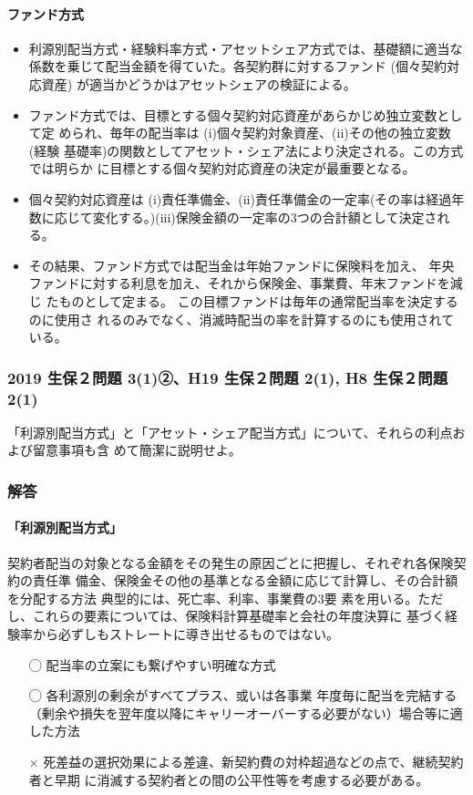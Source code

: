 \documentclass[report,gutter=10mm,fore-edge=10mm,uplatex,dvipdfmx]{jlreq}
\begin{document}
\paragraph{ファンド方式}

\begin{itemize}
 \item 利源別配当方式・経験料率方式・アセットシェア方式では、基礎額に適当な係数を乗じて配当金額を得ていた。各契約群に対するファンド (個々契約対応資産) が適当かどうかはアセットシェアの検証による。
 \item ファンド方式では、目標とする個々契約対応資産があらかじめ独立変数として定
められ、毎年の配当率は
(i)個々契約対象資産、(ii)その他の独立変数(経験
基礎率)の関数としてアセット・シェア法により決定される。この方式では明らか
に目標とする個々契約対応資産の決定が最重要となる。
 \item 個々契約対応資産は
(i)責任準備金、(ii)責任準備金の一定率(その率は経過年数に応じて変化する。)(iii)保険金額の一定率の3つの合計額として決定される。
 \item その結果、ファンド方式では配当金は年始ファンドに保険料を加え、
年央ファンドに対する利息を加え、それから保険金、事業費、年末ファンドを減じ
たものとして定まる。
この目標ファンドは毎年の通常配当率を決定するのに使用さ
れるのみでなく、消滅時配当の率を計算するのにも使用されている。
\end{itemize}


\subsubsection{2019 生保２問題 3(1)②、H19 生保２問題 2(1), H8 生保２問題 2(1)}
「利源別配当方式」と「アセット・シェア配当方式」について、それらの利点および留意事項も含
めて簡潔に説明せよ。
\subsubsection{解答}

\paragraph{「利源別配当方式」}
契約者配当の対象となる金額をその発生の原因ごとに把握し、それぞれ各保険契約の責任準
備金、保険金その他の基準となる金額に応じて計算し、その合計額を分配する方法
典型的には、死亡率、利率、事業費の3要
素を用いる。ただし、これらの要素については、保険料計算基礎率と会社の年度決算に
基づく経験率から必ずしもストレートに導き出せるものではない。
\begin{itemize}
 \item [◯] 配当率の立案にも繋げやすい明確な方式
 \item [◯] 各利源別の剰余がすべてプラス、或いは各事業
年度毎に配当を完結する（剰余や損失を翌年度以降にキャリーオーバーする必要がない）場合等に適した方法
 \item [×] 死差益の選択効果による差違、新契約費の対枠超過などの点で、継続契約者と早期
に消滅する契約者との間の公平性等を考慮する必要がある。
\end{itemize}
\end{document}

